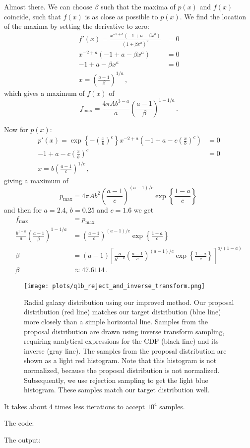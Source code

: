 Almost there. We can choose $\beta$ such that the maxima of $p(x)$ and $f(x)$ coincide, such that $f(x)$ is as close as possible to $p(x)$. We find the location of the maxima by setting the derivative to zero:
\begin{align}
    f'(x) = \frac{x^{-2 + a} (-1 + a - \beta x^a)}{(1 + \beta x^a)^2} &= 0 \\
    x^{-2 + a} (-1 + a - \beta x^a) &= 0 \\
    -1 + a - \beta x^a &= 0 \\
    x = \left( \frac{a-1}{\beta} \right)^{1/a} \, ,
\end{align}
which gives a maximum of $f(x)$ of 
\begin{equation}
    f_{\mathrm{max}} = \frac{4\pi A b^{3-a}}{a} \left( \frac{a-1}{\beta} \right)^{1-1/a} \, .
\end{equation}

Now for $p(x)$:
\begin{align}
    p'(x) = \exp\left\{ -\left(\frac{x}{b}\right)^c\right\} x^{-2 + a} \left(-1 + a - c \left(\frac{x}{b}\right)^c \right) &= 0 \\
    -1 + a - c \left(\frac{x}{b}\right)^c &= 0 \\
    x = b\left(\frac{a - 1}{c}\right)^{1/c} \, ,
\end{align}
giving a maximum of
\begin{equation}
    p_{\mathrm{max}} = 4\pi A b^{2} \left(\frac{a - 1}{c}\right)^{(a-1)/c} \exp\left\{\frac{1-a}{c} \right\} \,
\end{equation}
and then for $a=2.4$, $b=0.25$ and $c=1.6$ we get
\begin{align}
    f_{\mathrm{max}} &= p_{\mathrm{max}} \\
    \frac{b^{1-a}}{a} \left( \frac{a-1}{\beta} \right)^{1-1/a} &= \left(\frac{a - 1}{c}\right)^{(a-1)/c} \exp\left\{\frac{1-a}{c} \right\} \\
    \beta &= (a-1)\left[ \frac{a}{b^{1-a}} \left(\frac{a - 1}{c}\right)^{(a-1)/c} \exp\left\{\frac{1-a}{c} \right\} \right]^{a/(1-a)} \\
    \beta &\approx 47.6114 \, .
\end{align}

\begin{figure}[H]
    \centering
    \texttt{[image: plots/q1b\_reject\_and\_inverse\_transform.png]}
    \caption{Radial galaxy distribution using our improved method. Our proposal distribution (red line) matches our target distribution
    (blue line) more closely than a simple horizontal line. Samples from the proposal distribution are drawn using inverse transform 
    sampling, requiring analytical expressions for the CDF (black line) and its inverse (gray line). The samples from the proposal 
    distribution are shown as a light red histogram. Note that this histogram is not normalized, because the proposal distribution is
    not normalized. Subsequently, we use rejection sampling to get the light blue histogram. These samples match our target distribution well.
    }
\end{figure}

It takes about 4 times less iterations to accept $10^4$ samples.

\noindent The code:



\noindent The output:


